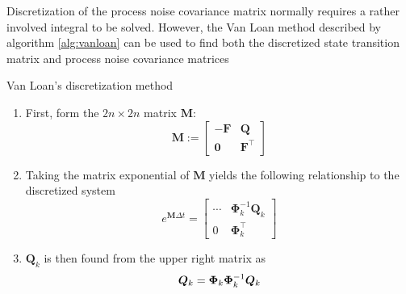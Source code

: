     Discretization of the process noise covariance matrix normally requires a rather involved integral to be solved. However, the Van Loan method described by algorithm \ref{alg:vanloan} can be used to find both the discretized state transition matrix and process noise covariance matrices \cite{van1978computing}

    \begin{algorithm}[!htbp]
        \caption{Van Loan's discretization method}
	    \label{alg:vanloan}
        \begin{minipage}{\dimexpr\textwidth-2\algomargin\relax}
            \begin{enumerate}
            \item First, form the $2n\times2n$ matrix $\bm{M}$:
            \begin{equation}
                \mathbf{M} := \left[\begin{array}{cc}-\mathbf{F} & {\mathbf{Q}} \\ {\mathbf{0}} & {\mathbf{F}^{\top}}\end{array}\right]
            \end{equation}
            \item Taking the matrix exponential of $\bm{M}$ yields the following relationship to the discretized system
            \begin{equation}
                e^{\mathbf{M} \Delta t} = \left[ \begin{array}{cc}{\cdots} & {\bm{\Phi}_{k}^{-1} \mathbf{Q}_{k}} \\ {0} & {\bm{\Phi}_{k}^{\top}}\end{array}\right]
            \end{equation}
            \item $\bm{Q}_k$ is then found from the upper right matrix as
            \begin{equation}
                \bm{Q}_k = \bm{\Phi}_k\bm{\Phi}_k^{-1}\bm{Q}_k
            \end{equation}
            \end{enumerate}
            \vspace{0.1cm}
        \end{minipage}
    \end{algorithm}

          

